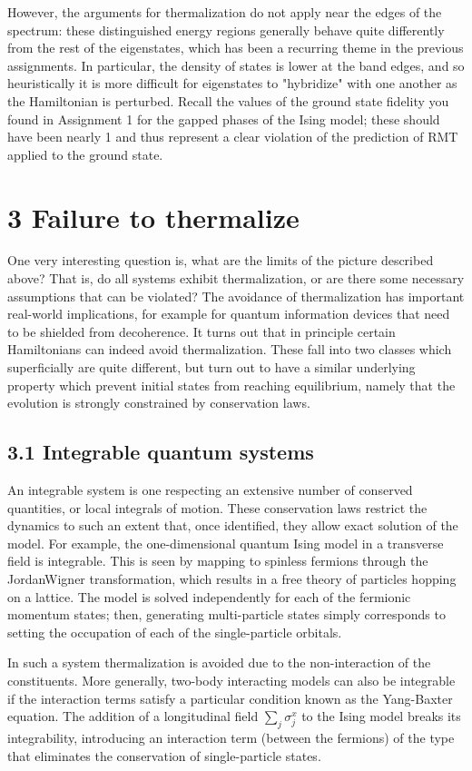 \documentclass[12pt]{article}
\begin{document}
However, the arguments for thermalization do not apply near the edges of the spectrum: these distinguished energy regions generally behave quite differently from the rest of the eigenstates, which has been a recurring theme in the previous assignments. In particular, the density of states is lower at the band edges, and so heuristically it is more difficult for eigenstates to "hybridize" with one another as the Hamiltonian is perturbed. Recall the values of the ground state fidelity you found in Assignment 1 for the gapped phases of the Ising model; these should have been nearly 1 and thus represent a clear violation of the prediction of RMT applied to the ground state.

\section*{3 Failure to thermalize}
One very interesting question is, what are the limits of the picture described above? That is, do all systems exhibit thermalization, or are there some necessary assumptions that can be violated? The avoidance of thermalization has important real-world implications, for example for quantum information devices that need to be shielded from decoherence. It turns out that in principle certain Hamiltonians can indeed avoid thermalization. These fall into two classes which superficially are quite different, but turn out to have a similar underlying property which prevent initial states from reaching equilibrium, namely that the evolution is strongly constrained by conservation laws.

\subsection*{3.1 Integrable quantum systems}
An integrable system is one respecting an extensive number of conserved quantities, or local integrals of motion. These conservation laws restrict the dynamics to such an extent that, once identified, they allow exact solution of the model. For example, the one-dimensional quantum Ising model in a transverse field is integrable. This is seen by mapping to spinless fermions through the JordanWigner transformation, which results in a free theory of particles hopping on a lattice. The model is solved independently for each of the fermionic momentum states; then, generating multi-particle states simply corresponds to setting the occupation of each of the single-particle orbitals.

In such a system thermalization is avoided due to the non-interaction of the constituents. More generally, two-body interacting models can also be integrable if the interaction terms satisfy a particular condition known as the Yang-Baxter equation. The addition of a longitudinal field $\sum_{j} \sigma_{j}^{x}$ to the Ising model breaks its integrability, introducing an interaction term (between the fermions) of the type that eliminates the conservation of single-particle states.
\end{document}
